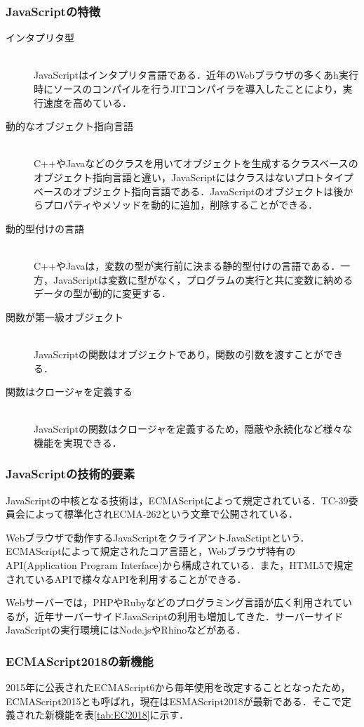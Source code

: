 \documentclass[a4j,12pt]{jsarticle}
\begin{document}
\subsubsection{JavaScriptの特徴}
\begin{description}
 \item[インタプリタ型]\mbox{}\\ 
JavaScriptはインタプリタ言語である．近年のWebブラウザの多くあh実行時にソースのコンパイルを行うJITコンパイラを導入したことにより，実行速度を高めている．
 \item[動的なオブジェクト指向言語]\mbox{}\\
  C++やJavaなどのクラスを用いてオブジェクトを生成するクラスベースのオブジェクト指向言語と違い，JavaScriptにはクラスはないプロトタイプベースのオブジェクト指向言語である．JavaScriptのオブジェクトは後からプロパティやメソッドを動的に追加，削除することができる．
 \item[動的型付けの言語]\mbox{}\\
C++やJavaは，変数の型が実行前に決まる静的型付けの言語である．一方，JavaScriptは変数に型がなく，プログラムの実行と共に変数に納めるデータの型が動的に変更する．	   
\item[関数が第一級オブジェクト]\mbox{}\\
JavaScriptの関数はオブジェクトであり，関数の引数を渡すことができる．	   
\item[関数はクロージャを定義する]\mbox{}\\
JavaScriptの関数はクロージャを定義するため，隠蔽や永続化など様々な機能を実現できる．
\end{description}
\subsubsection{JavaScriptの技術的要素}
JavaScriptの中核となる技術は，ECMAScriptによって規定されている．TC-39委員会によって標準化されECMA-262という文章で公開されている．

Webブラウザで動作するJavaScriptをクライアントJavaSctiptという．ECMAScriptによって規定されたコア言語と，Webブラウザ特有のAPI(Application Program Interface)から構成されている．また，HTML5で規定されているAPIで様々なAPIを利用することができる．

Webサーバーでは，PHPやRubyなどのプログラミング言語が広く利用されているが，近年サーバーサイドJavaScriptの利用も増加してきた．サーバーサイドJavaScriptの実行環境にはNode.jsやRhinoなどがある．

\subsubsection{ECMAScript2018の新機能}
2015年に公表されたECMAScript6から毎年使用を改定することとなったため，ECMAScript2015とも呼ばれ，現在はESMAScript2018が最新である．そこで定義された新機能を表\ref{tab:EC2018}に示す．
\end{document}
